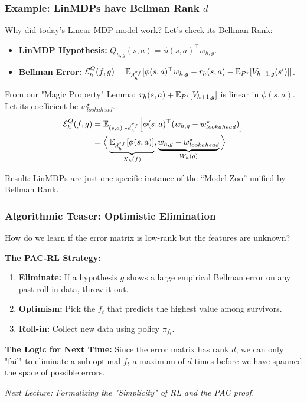 \documentclass[aspectratio=169]{beamer}
\begin{document}
\begin{frame}\frametitle{Example: LinMDPs have Bellman Rank $d$}

Why did today's Linear MDP model work? Let's check its Bellman Rank:
\begin{itemize}
    \item \textbf{LinMDP Hypothesis:} $Q_{h,g}(s,a) = \phi(s,a)^\top w_{h,g}$.
    \item \textbf{Bellman Error:} $\mathcal{E}_h^{Q}(f,g) = \mathbb{E}_{d_h^{\pi_f}}[ \phi(s,a)^\top w_{h,g} - r_h(s,a) - \mathbb{E}_{P^\star}[V_{h+1,g}(s')] ]$.
\end{itemize}

\pause
\vspace{0.2cm}
From our "Magic Property" Lemma: $r_h(s,a) + \mathbb{E}_{P^\star}[V_{h+1,g}]$ is linear in $\phi(s,a)$. Let its coefficient be $w_{lookahead}^\star$.
\begin{align*}
\mathcal{E}_h^{Q}(f,g) &= \mathbb{E}_{(s,a)\sim d_h^{\pi_f}} \Big[ \phi(s,a)^\top (w_{h,g} - w_{lookahead}^\star) \Big] \\
&= \Big\langle \underbrace{\mathbb{E}_{d_h^{\pi_f}}[\phi(s,a)]}_{X_h(f)}, \underbrace{w_{h,g} - w_{lookahead}^\star}_{W_h(g)} \Big\rangle
\end{align*}

\pause
\alert{Result:} LinMDPs are just one specific instance of the ``Model Zoo'' unified by Bellman Rank.
\end{frame}


\begin{frame}\frametitle{Algorithmic Teaser: Optimistic Elimination}

How do we learn if the error matrix is low-rank but the features are unknown?

\vspace{0.4cm}
\textbf{The PAC-RL Strategy:}
\begin{enumerate}
    \item \textbf{Eliminate:} If a hypothesis $g$ shows a large empirical Bellman error on any past roll-in data, throw it out.
    \item \textbf{Optimism:} Pick the $f_{t}$ that predicts the highest value among survivors.
    \item \textbf{Roll-in:} Collect new data using policy $\pi_{f_t}$.
\end{enumerate}

\vspace{0.4cm}
\pause
\textbf{The Logic for Next Time:}
Since the error matrix has rank $d$, we can only "fail" to eliminate a sub-optimal $f_t$ a maximum of $d$ times before we have spanned the space of possible errors. 

\vspace{0.2cm}
\textit{Next Lecture: Formalizing the "Simplicity" of RL and the PAC proof.}
\end{frame}
\end{document}
